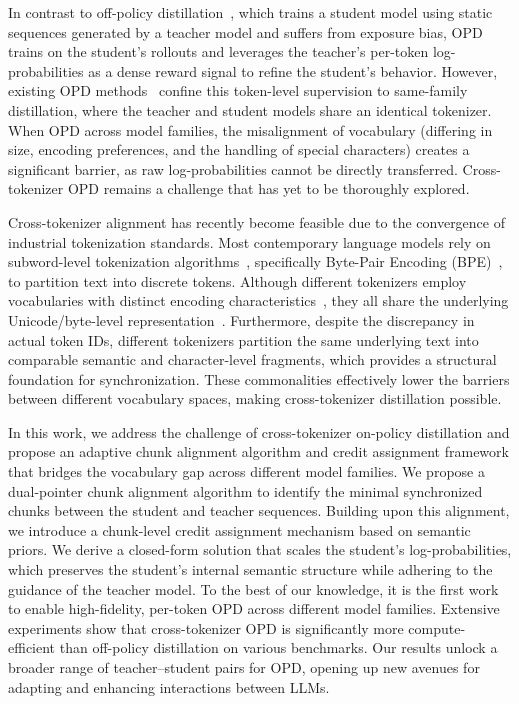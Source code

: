 \documentclass{article}
\theoremstyle{plain}
\theoremstyle{definition}
\theoremstyle{remark}
\begin{document}
In contrast to off-policy distillation~\cite{jiao2020tinybertdistillingbertnatural,wang2020minilmdeepselfattentiondistillation}, which trains a student model using static sequences generated by a teacher model and suffers from exposure bias, OPD trains on the student's rollouts and leverages the teacher’s per-token log-probabilities as a dense reward signal to refine the student's behavior. However, existing OPD methods~\cite{ko2025distillm2contrastiveapproachboosts,kim2026doesselfdistillationsometimesdegrade,xu2025kdrlposttrainingreasoningllms} confine this token-level supervision to same-family distillation, where the teacher and student models share an identical tokenizer. When OPD across model families, the misalignment of vocabulary (differing in size, encoding preferences, and the handling of special characters) creates a significant barrier, as raw log-probabilities cannot be directly transferred. Cross-tokenizer OPD remains a challenge that has yet to be thoroughly explored.

Cross-tokenizer alignment has recently become feasible due to the convergence of industrial tokenization standards. Most contemporary language models rely on subword-level tokenization algorithms~\cite{sennrich2016neuralmachinetranslationrare,kudo2018sentencepiecesimplelanguageindependent}, specifically Byte-Pair Encoding (BPE)~\cite{zouhar2024formalperspectivebytepairencoding}, to partition text into discrete tokens. Although different tokenizers employ vocabularies with distinct encoding characteristics~\cite{Nawrot_2023}, they all share the underlying Unicode/byte-level representation~\cite{xue2022byt5tokenfreefuturepretrained,pagnoni2024bytelatenttransformerpatches}. 
Furthermore, despite the discrepancy in actual token IDs, different tokenizers partition the same underlying text into comparable semantic and character-level fragments, which provides a structural foundation for synchronization. These commonalities effectively lower the barriers between different vocabulary spaces, making cross-tokenizer distillation possible.

In this work, we address the challenge of cross-tokenizer on-policy distillation and propose an adaptive chunk alignment algorithm and credit assignment framework that bridges the vocabulary gap across different model families.  We propose a dual-pointer chunk alignment algorithm to identify the minimal synchronized chunks between the student and teacher sequences. Building upon this alignment, we introduce a chunk-level credit assignment mechanism based on semantic priors. We derive a closed-form solution that scales the student’s log-probabilities, which preserves the student's internal semantic structure while adhering to the guidance of the teacher model. To the best of our knowledge, it is the first work to enable high-fidelity, per-token OPD across different model families. Extensive experiments show that cross-tokenizer OPD is significantly more compute-efficient than off-policy distillation on various benchmarks. Our results unlock a broader range of teacher–student pairs for OPD, opening up new avenues for adapting and enhancing interactions between LLMs.
\end{document}
